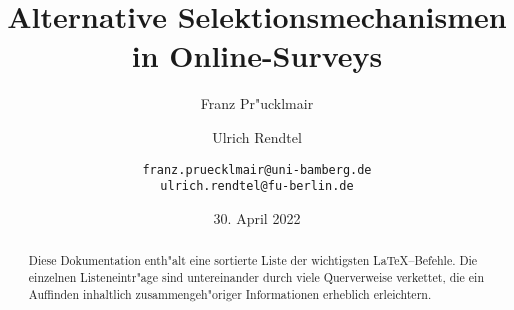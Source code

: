 
  
  \title{Alternative Selektionsmechanismen in Online-Surveys}
  \author{Franz Pr"ucklmair \and Ulrich Rendtel \and \verb+franz.pruecklmair@uni-bamberg.de+ \\
\verb+ulrich.rendtel@fu-berlin.de+}
  \date{30. April 2022}
  \maketitle

  \begin{abstract}

  Diese Dokumentation enth"alt eine sortierte Liste der wichtigsten
  \LaTeX--Befehle. Die einzelnen Listeneintr"age sind untereinander
  durch viele Querverweise verkettet, die ein Auffinden inhaltlich
  zusammengeh"origer Informationen erheblich erleichtern.

  \end{abstract}
  